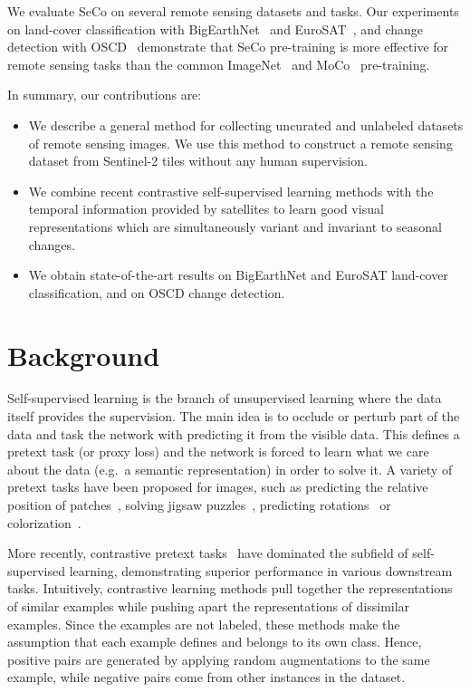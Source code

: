 \documentclass[10pt,twocolumn,letterpaper]{article}
\newcommand{\methodname}[0]{SeCo}
\begin{document}
We evaluate \methodname{} on several remote sensing datasets and tasks. Our experiments on land-cover classification with BigEarthNet~\cite{sumbul2019bigearthnet} and EuroSAT~\citep{helber2019eurosat}, and change detection with OSCD~\citep{daudt2018urban} demonstrate that \methodname{} pre-training is more effective for remote sensing tasks than the common ImageNet~\citep{russakovsky2014imagenet} and MoCo~\citep{he2020momentum} pre-training.

In summary, our contributions are:
\begin{itemize}
    \item We describe a general method for collecting uncurated and unlabeled datasets of remote sensing images. We use this method to construct a remote sensing dataset from Sentinel-2 tiles without any human supervision.
    \item We combine recent contrastive self-supervised learning methods with the temporal information provided by satellites to learn good visual representations which are simultaneously variant and invariant to seasonal changes.
    \item We obtain state-of-the-art results on BigEarthNet and EuroSAT land-cover classification, and on OSCD change detection.
\end{itemize}

\section{Background}
Self-supervised learning is the branch of unsupervised learning where the data itself provides the supervision. The main idea is to occlude or perturb part of the data and task the network with predicting it from the visible data. This defines a pretext task (or proxy loss) and the network is forced to learn what we care about the data (e.g.\ a semantic representation) in order to solve it. A variety of pretext tasks have been proposed for images, such as predicting the relative position of patches~\cite{doersch2015unsupervised}, solving jigsaw puzzles~\cite{noroozi2016unsupervised}, predicting rotations~\cite{gidaris2018unsupervised} or colorization~\cite{zhang2016colorful}.

More recently, contrastive pretext tasks~\cite{wu2018unsupervised, oord2018representation, tian2019contrastive, he2020momentum, misra2020self, chen2020simple, grill2020bootstrap, caron2020unsupervised} have dominated the subfield of self-supervised learning, demonstrating superior performance in various downstream tasks. Intuitively, contrastive learning methods pull together the representations of similar examples while pushing apart the representations of dissimilar examples. Since the examples are not labeled, these methods make the assumption that each example defines and belongs to its own class. Hence, positive pairs are generated by applying random augmentations to the same example, while negative pairs come from other instances in the dataset.
\end{document}
